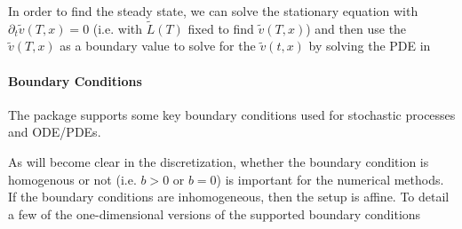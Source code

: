 \documentclass[11pt]{article}
\newcommand{\D}[1][]{\ensuremath{\partial_{#1}}}
\theoremstyle{definition}
\begin{document}
In order to find the steady state, we can solve the stationary equation with $\D[t] \tilde{v}(T, x) = 0$ (i.e. with $\tilde{L}(T)$ fixed to find $\tilde{v}(T,x)$) and then use the  $\tilde{v}(T,x)$ as a boundary value to solve for the $\tilde{v}(t,x)$ by solving the PDE in


\paragraph{Boundary Conditions}
The package supports some key boundary conditions used for stochastic processes and ODE/PDEs.

As will become clear in the discretization, whether the boundary condition is homogenous or not (i.e. $b>0$ or $b = 0$) is important for the numerical methods.  If the boundary conditions are inhomogeneous, then the setup is affine.  To detail a few of the one-dimensional versions of the supported boundary conditions
\end{document}
